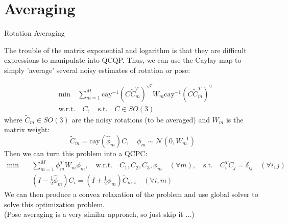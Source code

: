 \documentclass[8pt]{beamer}
\begin{document}
\section{Averaging}
\begin{frame}{Rotation Averaging}

The trouble of the matrix exponential and logarithm is that they are difficult expressions to manipulate into QCQP. Thus, we can use the Caylay map to simply 'average' several noisy estimates of rotation or pose:

\begin{equation}
\begin{aligned}
& \text{min} \quad \sum_{m=1}^{M} \text{cay}^{-1} \left( C \tilde{C}^T_m \right)^{\vee^T} W_m \text{cay}^{-1} \left( C \tilde{C}^T_m \right) ^\vee \\
& \text{w.r.t.} \quad C, \quad \text{s.t.} \quad C \in SO(3)
\end{aligned}
\end{equation}
where \(\tilde{C}_m \in SO(3)\) are the noisy rotations (to be averaged) and \(W_m\) is the matrix weight:
\begin{equation}
\tilde{C}_m = \text{cay}(\hat{\phi}_m) C, \quad \phi_m \sim \mathcal{N}(0, W_m^{-1})
\end{equation}
Then we can turn this problem into a QCPC:
\begin{equation}
\begin{aligned}
\text{min} \quad & \sum_{m=1}^{M} \phi_m^T W_m \phi_m, \quad \text{w.r.t.} \quad C_1, C_2, C_3, \phi_m \quad (\forall m), \quad \text{s.t.} \quad  C_i^T C_j = \delta_{ij} \quad (\forall i, j) \\
& (I - \frac{1}{2} \hat{\phi}_m) C_i = (I + \frac{1}{2} \hat{\phi}_m) \tilde{C}_{m,i} \quad (\forall i, m)
\end{aligned}
\end{equation}
We can then produce a convex relaxation of the problem and use global solver to solve this optimization problem.\\
(Pose averaging is a very similar approach, so just skip it ...)
\end{frame}
\end{document}
